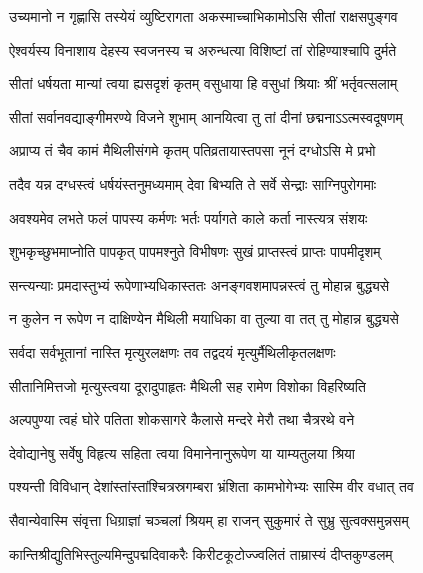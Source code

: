 \twolineshloka
{उच्यमानो न गृह्णासि तस्येयं व्युष्टिरागता}
{अकस्माच्चाभिकामोऽसि सीतां राक्षसपुङ्गव} %

\twolineshloka
{ऐश्वर्यस्य विनाशाय देहस्य स्वजनस्य च}
{अरुन्धत्या विशिष्टां तां रोहिण्याश्चापि दुर्मते} %

\twolineshloka
{सीतां धर्षयता मान्यां त्वया ह्यसदृशं कृतम्}
{वसुधाया हि वसुधां श्रियाः श्रीं भर्तृवत्सलाम्} %

\twolineshloka
{सीतां सर्वानवद्याङ्गीमरण्ये विजने शुभाम्}
{आनयित्वा तु तां दीनां छद्मनाऽऽत्मस्वदूषणम्} %

\twolineshloka
{अप्राप्य तं चैव कामं मैथिलीसंगमे कृतम्}
{पतिव्रतायास्तपसा नूनं दग्धोऽसि मे प्रभो} %

\twolineshloka
{तदैव यन्न दग्धस्त्वं धर्षयंस्तनुमध्यमाम्}
{देवा बिभ्यति ते सर्वे सेन्द्राः साग्निपुरोगमाः} %

\twolineshloka
{अवश्यमेव लभते फलं पापस्य कर्मणः}
{भर्तः पर्यागते काले कर्ता नास्त्यत्र संशयः} %

\twolineshloka
{शुभकृच्छुभमाप्नोति पापकृत् पापमश्नुते}
{विभीषणः सुखं प्राप्तस्त्वं प्राप्तः पापमीदृशम्} %

\twolineshloka
{सन्त्यन्याः प्रमदास्तुभ्यं रूपेणाभ्यधिकास्ततः}
{अनङ्गवशमापन्नस्त्वं तु मोहान्न बुद्ध्यसे} %

\twolineshloka
{न कुलेन न रूपेण न दाक्षिण्येन मैथिली}
{मयाधिका वा तुल्या वा तत् तु मोहान्न बुद्ध्यसे} %

\twolineshloka
{सर्वदा सर्वभूतानां नास्ति मृत्युरलक्षणः}
{तव तद्वदयं मृत्युर्मैथिलीकृतलक्षणः} %

\twolineshloka
{सीतानिमित्तजो मृत्युस्त्वया दूरादुपाहृतः}
{मैथिली सह रामेण विशोका विहरिष्यति} %

\twolineshloka
{अल्पपुण्या त्वहं घोरे पतिता शोकसागरे}
{कैलासे मन्दरे मेरौ तथा चैत्ररथे वने} %

\twolineshloka
{देवोद्यानेषु सर्वेषु विहृत्य सहिता त्वया}
{विमानेनानुरूपेण या याम्यतुलया श्रिया} %

\twolineshloka
{पश्यन्ती विविधान् देशांस्तांस्तांश्चित्रस्रगम्बरा}
{भ्रंशिता कामभोगेभ्यः सास्मि वीर वधात् तव} %

\twolineshloka
{सैवान्येवास्मि संवृत्ता धिग्राज्ञां चञ्चलां श्रियम्}
{हा राजन् सुकुमारं ते सुभ्रु सुत्वक्समुन्नसम्} %

\twolineshloka
{कान्तिश्रीद्युतिभिस्तुल्यमिन्दुपद्मदिवाकरैः}
{किरीटकूटोज्ज्वलितं ताम्रास्यं दीप्तकुण्डलम्} %

